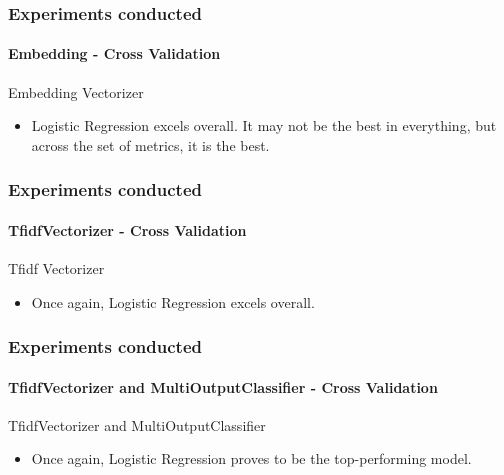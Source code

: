 \begin{frame}  %
	\frametitle{Experiments conducted}
	\framesubtitle{Embedding - Cross Validation}


	\begin{exampleblock}{Embedding Vectorizer} 
		\begin{itemize}
			\item Logistic Regression excels overall. It may not be the best in everything, but across the set of metrics, it is the best.
		\end{itemize}
	\end{exampleblock}

	
	\begin{table}
		\centering
		\resizebox{1\textwidth}{!}{
			
		}
		\caption{Embedding - Cross Validation}
	\end{table}


\end{frame}
\begin{frame} 
	\frametitle{Experiments conducted}  %
	\framesubtitle{TfidfVectorizer - Cross Validation}

	\begin{exampleblock}{Tfidf Vectorizer} 
		\begin{itemize}
			\item Once again, Logistic Regression excels overall.
		\end{itemize}
	\end{exampleblock}

	
	\begin{table}
		\centering
		\resizebox{1\textwidth}{!}{
			
		}
		\caption{TfidfVectorizer - Cross Validation}
	\end{table}


\end{frame}
\begin{frame}
	\frametitle{Experiments conducted}  %
	\framesubtitle{TfidfVectorizer and MultiOutputClassifier - Cross Validation}

	\begin{exampleblock}{TfidfVectorizer and MultiOutputClassifier} 
		\begin{itemize}
			\item Once again, Logistic Regression proves to be the top-performing model.
		\end{itemize}
	\end{exampleblock}
	
	\begin{table}
		\centering
		\resizebox{1\textwidth}{!}{
			
		}
		\caption{TfidfVectorizer and MultiOutputClassifier - Cross Validation}
	\end{table}

\end{frame}
